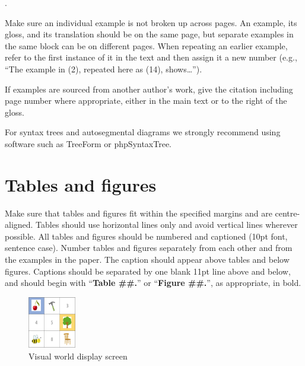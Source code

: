 \documentclass[xelatex,linguex]{TWPL}
\begin{document}
\ex. 

Make sure an individual example is not broken up across pages. An example, its gloss, and its translation should be on the same page, but separate examples in the same block can be on different pages. When repeating an earlier example, refer to the first instance of it in the text and then assign it a new number (e.g., ``The example in (2), repeated here as (14), shows\ldots'').

If examples are sourced from another author's work, give the citation including page number where appropriate, either in the main text or to the right of the gloss.

For syntax trees and autosegmental diagrams we strongly recommend using software such as TreeForm or phpSyntaxTree.

\section{Tables and figures}

Make sure that tables and figures fit within the specified margins and are centre-aligned. Tables should use horizontal lines only and avoid vertical lines wherever possible. All tables and figures should be numbered and captioned (10pt font, sentence case). Number tables and figures separately from each other and from the examples in the paper. The caption should appear above tables and below figures. Captions should be separated by one blank 11pt line above and below, and should begin with ``\textbf{Table \#\#.}'' or ``\textbf{Figure \#\#.}'', as appropriate, in bold.

 \begin{figure}

\includegraphics[width=2.1cm]{visual-world.png}

\caption{Visual world display screen}
\end{figure}
\end{document}
